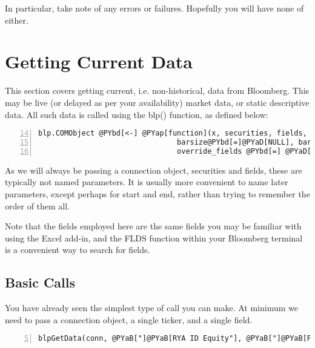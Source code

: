 \documentclass[a4paper]{article}
\begin{document}
    

In particular, take note of any errors or failures. Hopefully you will have none of either.



\section{Getting Current Data} %
\label{sec:getting_current_data}

This section covers getting current, i.e. non-historical, data from Bloomberg. This may be live (or delayed as per your availability) market data, or static descriptive data. All such data is called using the blp() function, as defined below:


\begin{Verbatim}[commandchars=@\[\],numbers=left,firstnumber=14,stepnumber=1]
blp.COMObject @PYbd[<-] @PYap[function](x, securities, fields, start@PYbd[=]@PYaD[NULL], end@PYbd[=]@PYaD[NULL],
                                barsize@PYbd[=]@PYaD[NULL], barfields@PYbd[=]@PYaD[NULL], retval@PYbd[=]@PYaD[NULL], 
                                override_fields @PYbd[=] @PYaD[NULL], overrides @PYbd[=] @PYaD[NULL], currency @PYbd[=] @PYaD[NULL], ...) {
\end{Verbatim}

    

As we will always be passing a connection object, securities and fields, these are typically not named parameters. It is usually more convenient to name later parameters, except perhaps for start and end, rather than trying to remember the order of them all.

Note that the fields employed here are the same fields you may be familiar with using the Excel add-in, and the FLDS function within your Bloomberg terminal is a convenient way to search for fields.

\subsection{Basic Calls} %
\label{sub:basic_calls}

You have already seen the simplest type of call you can make. At minimum we need to pass a connection object, a single ticker, and a single field.

\begin{Verbatim}[commandchars=@\[\],numbers=left,firstnumber=5,stepnumber=1]
blpGetData(conn, @PYaB["]@PYaB[RYA ID Equity"], @PYaB["]@PYaB[PX_LAST"])
\end{Verbatim}
\end{document}
